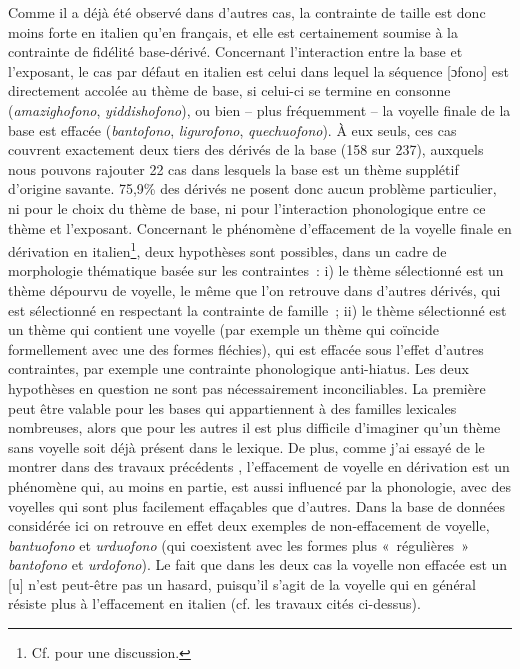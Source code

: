 \documentclass[output=paper]{langsci/langscibook}
\begin{document}
Comme il a déjà été observé dans d'autres cas, la contrainte de taille
est donc moins forte en italien qu'en français, et elle est certainement
soumise à la contrainte de fidélité base-dérivé. Concernant
l'interaction entre la base et l'exposant, le cas par défaut en italien
est celui dans lequel la séquence {[}ɔfono{]} est directement accolée au
thème de base, si celui-ci se termine en consonne (\emph{amazighofono},
\emph{yiddishofono}), ou bien -- plus fréquemment -- la voyelle finale
de la base est effacée (\emph{bantofono}, \emph{ligurofono},
\emph{quechuofono}). À eux seuls, ces cas couvrent exactement deux tiers
des dérivés de la base (158 sur 237), auxquels nous pouvons rajouter 22
cas dans lesquels la base est un thème supplétif d'origine savante.
75,9\% des dérivés ne posent donc aucun problème particulier, ni pour le
choix du thème de base, ni pour l'interaction phonologique entre ce
thème et l'exposant. Concernant le phénomène d'effacement de la voyelle
finale en dérivation en italien\footnote{Cf. %
\citet{Montermini10} %
%
pour une
  discussion.}, deux hypothèses sont possibles, dans un cadre de
morphologie thématique basée sur les contraintes~: i) le thème
sélectionné est un thème dépourvu de voyelle, le même que l'on retrouve
dans d'autres dérivés, qui est sélectionné en respectant la contrainte
de famille~; ii) le thème sélectionné est un thème qui contient une
voyelle (par exemple un thème qui coïncide formellement avec une des
formes fléchies), qui est effacée sous l'effet d'autres contraintes, par
exemple une contrainte phonologique anti-hiatus. Les deux hypothèses en
question ne sont pas nécessairement inconciliables. La première peut
être valable pour les bases qui appartiennent à des familles lexicales
nombreuses, alors que pour les autres il est plus difficile d'imaginer
qu'un thème sans voyelle soit déjà présent dans le lexique. De plus,
comme j'ai essayé de le montrer dans des travaux précédents %
\citep{Montermini2003,Montermini10}%
%
, l'effacement de voyelle en dérivation est un phénomène qui,
au moins en partie, est aussi influencé par la phonologie, avec des
voyelles qui sont plus facilement effaçables que d'autres. 
\largerpage
Dans la base
de données considérée ici on retrouve en effet deux exemples de
non-effacement de voyelle, \emph{bantuofono} et \emph{urduofono} (qui
coexistent avec les formes plus «~régulières~» \emph{bantofono} et
\emph{urdofono}). Le fait que dans les deux cas la voyelle non effacée
est un {[}u{]} n'est peut-être pas un hasard, puisqu'il s'agit de la
voyelle qui en général résiste plus à l'effacement en italien (cf. les
travaux cités ci-dessus).
\end{document}
